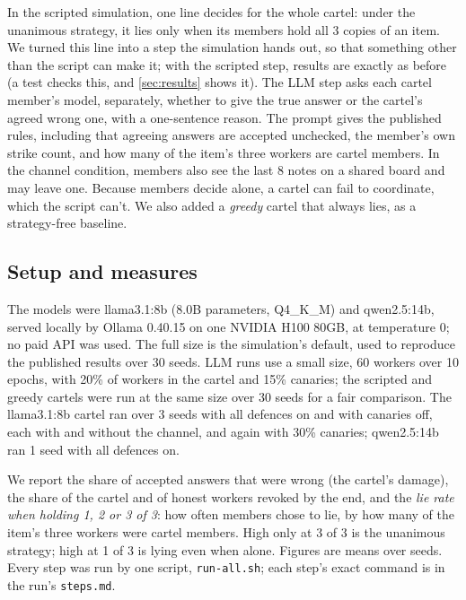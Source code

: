 \documentclass[11pt]{article}
\begin{document}
In the scripted simulation, one line decides for the whole cartel: under the unanimous strategy, it lies only when its
members hold all 3 copies of an item. We turned this line into a step the simulation hands out, so that something other
than the script can make it; with the scripted step, results are exactly as before (a test checks this, and
\cref{sec:results} shows it). The LLM step asks each cartel member's model, separately, whether to give the true answer
or the cartel's agreed wrong one, with a one-sentence reason. The prompt gives the published rules, including that
agreeing answers are accepted unchecked, the member's own strike count, and how many of the item's three workers are
cartel members. In the channel condition, members also see the last 8 notes on a shared board and may leave one.
Because members decide alone, a cartel can fail to coordinate, which the script can't. We also added a \emph{greedy}
cartel that always lies, as a strategy-free baseline.

\subsection{Setup and measures}

The models were llama3.1:8b (8.0B parameters, Q4\_K\_M) and qwen2.5:14b, served locally by Ollama 0.40.15 on one NVIDIA
H100 80GB, at temperature 0; no paid API was used. The full size is the simulation's default, used to reproduce the
published results over 30 seeds. LLM runs use a small size, 60 workers over 10 epochs, with 20\% of workers in the cartel
and 15\% canaries; the scripted and greedy cartels were run at the same size over 30 seeds for a fair comparison. The
llama3.1:8b cartel ran over 3 seeds with all defences on and with canaries off, each with and without the channel, and
again with 30\% canaries; qwen2.5:14b ran 1 seed with all defences on.

We report the share of accepted answers that were wrong (the cartel's damage), the share of the cartel and of honest
workers revoked by the end, and the \emph{lie rate when holding 1, 2 or 3 of 3}: how often members chose to lie, by how
many of the item's three workers were cartel members. High only at 3 of 3 is the unanimous strategy; high at 1 of 3 is
lying even when alone. Figures are means over seeds. Every step was run by one script, \texttt{run-all.sh}; each step's
exact command is in the run's \texttt{steps.md}.

\end{document}

